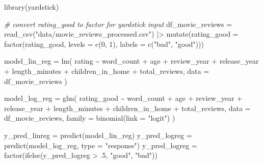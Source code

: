 \documentclass[
  letterpaper,
]{krantz}
\newenvironment{Shaded}{}{}
\newcommand{\AttributeTok}[1]{\textcolor[rgb]{0.49,0.56,0.16}{#1}}
\newcommand{\CommentTok}[1]{\textcolor[rgb]{0.38,0.63,0.69}{\textit{#1}}}
\newcommand{\DecValTok}[1]{\textcolor[rgb]{0.25,0.63,0.44}{#1}}
\newcommand{\FunctionTok}[1]{\textcolor[rgb]{0.02,0.16,0.49}{#1}}
\newcommand{\NormalTok}[1]{#1}
\newcommand{\OtherTok}[1]{\textcolor[rgb]{0.00,0.44,0.13}{#1}}
\newcommand{\SpecialCharTok}[1]{\textcolor[rgb]{0.25,0.44,0.63}{#1}}
\newcommand{\StringTok}[1]{\textcolor[rgb]{0.25,0.44,0.63}{#1}}
\begin{document}
\begin{Shaded}
\begin{Highlighting}[]
\FunctionTok{library}\NormalTok{(yardstick)}

\CommentTok{\# convert rating\_good to factor for yardstick input}
\NormalTok{df\_movie\_reviews }\OtherTok{=} \FunctionTok{read\_csv}\NormalTok{(}\StringTok{"data/movie\_reviews\_processed.csv"}\NormalTok{) }\SpecialCharTok{|\textgreater{}} 
  \FunctionTok{mutate}\NormalTok{(}\AttributeTok{rating\_good =} \FunctionTok{factor}\NormalTok{(rating\_good, }\AttributeTok{levels =} \FunctionTok{c}\NormalTok{(}\DecValTok{0}\NormalTok{, }\DecValTok{1}\NormalTok{), }\AttributeTok{labels =} \FunctionTok{c}\NormalTok{(}\StringTok{"bad"}\NormalTok{, }\StringTok{"good"}\NormalTok{)))}

\NormalTok{model\_lin\_reg }\OtherTok{=} \FunctionTok{lm}\NormalTok{(}
\NormalTok{    rating }\SpecialCharTok{\textasciitilde{}}
\NormalTok{        word\_count}
        \SpecialCharTok{+}\NormalTok{ age}
        \SpecialCharTok{+}\NormalTok{ review\_year}
        \SpecialCharTok{+}\NormalTok{ release\_year}
        \SpecialCharTok{+}\NormalTok{ length\_minutes}
        \SpecialCharTok{+}\NormalTok{ children\_in\_home}
        \SpecialCharTok{+}\NormalTok{ total\_reviews,}
    \AttributeTok{data =}\NormalTok{ df\_movie\_reviews}
\NormalTok{)}

\NormalTok{model\_log\_reg }\OtherTok{=} \FunctionTok{glm}\NormalTok{(}
\NormalTok{    rating\_good }\SpecialCharTok{\textasciitilde{}}
\NormalTok{        word\_count}
        \SpecialCharTok{+}\NormalTok{ age}
        \SpecialCharTok{+}\NormalTok{ review\_year}
        \SpecialCharTok{+}\NormalTok{ release\_year}
        \SpecialCharTok{+}\NormalTok{ length\_minutes}
        \SpecialCharTok{+}\NormalTok{ children\_in\_home}
        \SpecialCharTok{+}\NormalTok{ total\_reviews,}
    \AttributeTok{data =}\NormalTok{ df\_movie\_reviews,}
    \AttributeTok{family =} \FunctionTok{binomial}\NormalTok{(}\AttributeTok{link =} \StringTok{"logit"}\NormalTok{)}
\NormalTok{)}

\NormalTok{y\_pred\_linreg }\OtherTok{=} \FunctionTok{predict}\NormalTok{(model\_lin\_reg)}
\NormalTok{y\_pred\_logreg }\OtherTok{=} \FunctionTok{predict}\NormalTok{(model\_log\_reg, }\AttributeTok{type =} \StringTok{"response"}\NormalTok{)}
\NormalTok{y\_pred\_logreg }\OtherTok{=} \FunctionTok{factor}\NormalTok{(}\FunctionTok{ifelse}\NormalTok{(y\_pred\_logreg }\SpecialCharTok{\textgreater{}}\NormalTok{ .}\DecValTok{5}\NormalTok{, }\StringTok{"good"}\NormalTok{, }\StringTok{"bad"}\NormalTok{))}



\end{Highlighting}
\end{Shaded}
\end{document}
